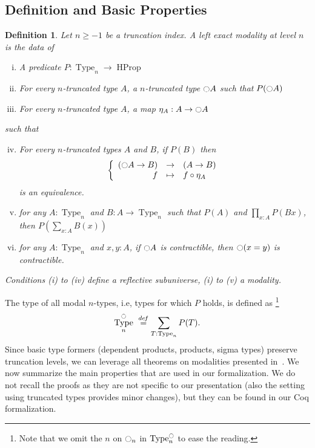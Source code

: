 \documentclass[preprint,9pt,numbers]{sigplanconf}
\newtheorem{defi}[thm]{Definition}
\newcommand \defeq {\overset{de\hspace{-0.2ex}f}{=}}
\newcommand{\ie}{i.e,\xspace}
\DeclareMathOperator{\Type}{Type}
\DeclareMathOperator{\HProp}{HProp}
\newcommand{\modal}{\ensuremath{\ocircle}}
\newenvironment{mymath}[1][-0em]{%
  \newcommand\mymathaux{\vspace{#1}}%
  \vspace{#1}%
  \begin{equation*}%
  }{ %
    \mymathaux%
  \end{equation*}}
\begin{document}
\subsection{Definition and Basic Properties}
\label{sec:definition}

\begin{defi}
  \label{sec:defin-basic-prop-1}
  Let $n\geq -1$ be a truncation index. A left exact modality at level
  $n$ is the data of
  \begin{enumerate}[(i)]
  \item A predicate $P:\Type_n \to \HProp$
  \item For every $n$-truncated type $A$, a $n$-truncated type
    $\modal A$ such that $P(\modal A)$
  \item For every $n$-truncated type $A$, a map $\eta_A:A \to
    \modal A$
  \end{enumerate}
  such that
  \begin{enumerate}[(i)]
    \setcounter{enumi}{3}
  \item For every $n$-truncated types $A$ and $B$, if $P(B)$ then
    \begin{mymath}\left\{
      \begin{array}{rcl}
        (\modal A \to B) & \to & (A \to B) \\
        f & \mapsto & f \circ \eta_A
      \end{array} \right.\end{mymath}%
    is an equivalence.
  \item for any $A:\Type_n$ and $B:A \to \Type_n$ such that $P(A)$
    and $\prod_{x:A} P(B x)$, then $P\left( \sum_{x:A} B(x)\right)$
  \item for any $A:\Type_n$ and $x,y:A$, if $\modal A$ is
    contractible, then $\modal (x=y)$ is contractible.
  \end{enumerate}
  Conditions (i) to (iv) define a {\em reflective subuniverse}, (i) to
  (v) a {\em modality}.
\end{defi}

The type of all modal $n$-types, \ie types for which $P$ holds, is
defined as \footnote{Note that we omit the $n$
on $\modal_n$ in $\Type_n^\modal$ to ease the reading.} %
\begin{mymath}
\Type_n^\modal \ \defeq \sum_{T : \Type_n} P (T).
\end{mymath}%
%
Since basic type formers (dependent products, products, sigma types)
preserve truncation levels, we can leverage all theorems on modalities
presented in~\cite[Chapter 7.7]{hottbook}.
%
We now summarize the main properties that are used in our
formalization. We do not recall the proofs as they are not specific to
our presentation (also the setting using truncated types provides
minor changes), but they can be found in our Coq formalization. 
 
\end{document}
